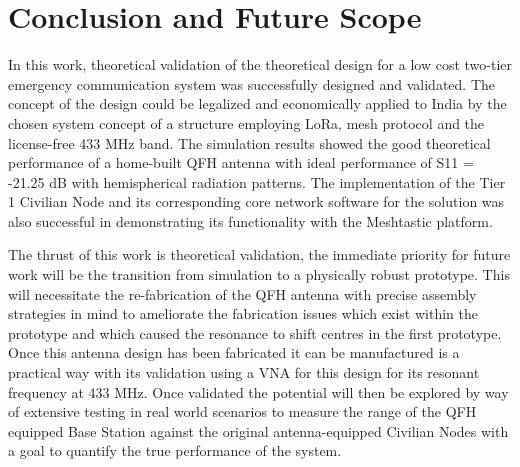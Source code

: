 \chapter{Conclusion and Future Scope}
\label{Chapter6}

In this work, theoretical validation of the theoretical design for a low cost two-tier emergency communication system was successfully designed and validated. The concept of the design could be legalized and economically applied to India by the chosen system concept of a structure employing LoRa, mesh protocol and the license-free 433 MHz band. The simulation results showed the good theoretical performance of a home-built QFH antenna with ideal performance of S11 = -21.25 dB with hemispherical radiation patterns. The implementation of the Tier 1 Civilian Node and its corresponding core network software for the solution was also successful in demonstrating its functionality with the Meshtastic platform. 

The thrust of this work is theoretical validation, the immediate priority for future work will be the transition from simulation to a physically robust prototype. This will necessitate the re-fabrication of the QFH antenna with precise assembly strategies in mind to ameliorate the fabrication issues which exist within the prototype and which caused the resonance to shift centres in the first prototype. Once this antenna design has been fabricated it can be manufactured is a practical way with its validation using a VNA for this design for its resonant frequency at 433 MHz. Once validated the potential will then be explored by way of extensive testing in real world scenarios to measure the range of the QFH equipped Base Station against the original antenna-equipped Civilian Nodes with a goal to quantify the true performance of the system.
